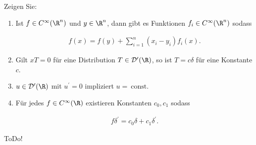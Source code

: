 
\begin{exercise}

Zeigen Sie:

\begin{enumerate}[label = (\roman*)]

    \item Ist $f \in C^\infty(\R^n)$ und $y \in \R^n$, dann gibt es Funktionen $f_i \in C^\infty(\R^n)$ sodass
    
    \begin{align*}
        f(x) = f(y) + \sum_{i=1}^n (x_i - y_i) f_i(x).
    \end{align*}

    \item Gilt $xT = 0$ für eine Distribution $T \in \mathcal{D}^\prime(\R)$, so ist $T = c \delta$ für eine Konstante $c$.
    \item $u \in \mathcal{D}^\prime(\R)$ mit $u^\prime = 0$ impliziert $u = ~\text{const}$.
    \item Für jedes $f \in C^\infty(\R)$ existieren Konstanten $c_0, c_1$ sodass
    
    \begin{align*}
        f \delta^\prime
        =
        c_0 \delta
        +
        c_1 \delta^\prime.
    \end{align*}

\end{enumerate}

\end{exercise}


\begin{solution}

ToDo!

\end{solution}


